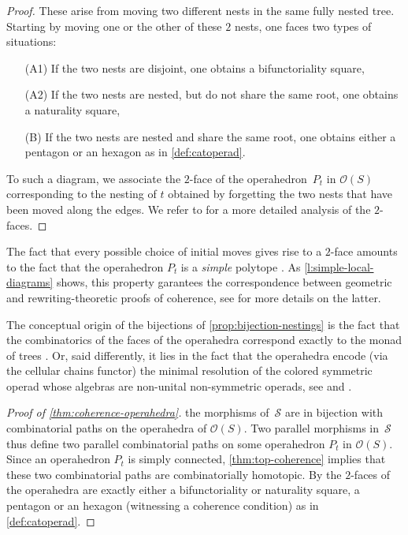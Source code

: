 {\begin{proof}
These arise from moving two different nests in the same fully nested tree. 
Starting by moving one or the other of these $2$ nests, one faces two types of situations:
\begin{itemize}
    \item[(A1)] If the two nests are disjoint, one obtains a bifunctoriality square,
    \item[(A2)] If the two nests are nested, but do not share the same root, one obtains a naturality square,
    \item[(B)] If the two nests are nested and share the same root, one obtains either a pentagon or an hexagon as in \cref{def:catoperad}.
\end{itemize}
To such a diagram, we associate the $2$-face of the operahedron~$P_t$ in $\mathcal{O}(S)$ corresponding to the nesting of $t$ obtained by forgetting the two nests that have been moved along the edges.
We refer to \cite[Sec.~2]{CLA24} for a more detailed analysis of the $2$-faces.  
\end{proof}
\begin{rem}
    The fact that every possible choice of initial moves gives rise to a $2$-face amounts to the fact that the operahedron $P_t$ is a \emph{simple} polytope \cite[Sec.~9]{DP-HP}.
    As \cref{l:simple-local-diagrams} shows, this property garantees the correspondence between geometric and rewriting-theoretic proofs of coherence, see \cite{CLA24} for more details on the latter.
\end{rem}
The conceptual origin of the bijections of \cref{prop:bijection-nestings} is the fact that the combinatorics of the faces of the operahedra correspond exactly to the monad of trees \cite[Sec.~5.6.1]{LodayVallette12}.
Or, said differently, it lies in the fact that the operahedra encode (via the cellular chains functor) the minimal resolution of the colored symmetric operad whose algebras are non-unital non-symmetric operads, see \cite{VanDerLaan03} and \cite[Sec.~4.1]{laplante-anfossiDiagonalOperahedra2022a}.}

\begin{proof}[Proof of {\cref{thm:coherence-operahedra}}]
     the morphisms of~$\mathcal{S}$ are in bijection with combinatorial paths on the operahedra of $\mathcal{O}(S)$.
Two parallel morphisms in~$\mathcal{S}$ thus define two parallel combinatorial paths on some operahedron $P_t$ in $\mathcal{O}(S)$. 
Since an operahedron $P_t$ is simply connected, \cref{thm:top-coherence} implies that these two combinatorial paths are combinatorially homotopic. 
By  the $2$-faces of the operahedra are exactly either a bifunctoriality or naturality square, a pentagon or an hexagon (witnessing a coherence condition) as in \cref{def:catoperad}.
\end{proof}

